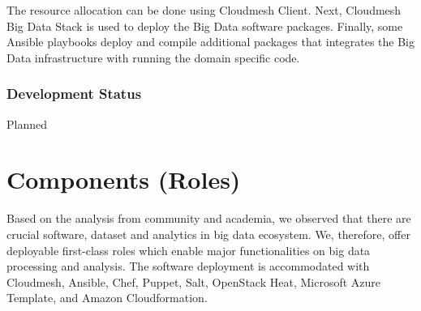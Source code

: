 \documentclass[9pt,twocolumn,twoside]{styles/osajnl}
\begin{document}
The resource allocation can be done using Cloudmesh Client.  Next,
Cloudmesh Big Data Stack is used to deploy the Big Data software
packages.  Finally, some Ansible playbooks deploy and compile
additional packages that integrates the Big Data infrastructure with
running the domain specific code.

\subsubsection{Development Status}

Planned




\section{Components (Roles)}

Based on the analysis from community and academia, we observed that
there are crucial software, dataset and analytics in big data
ecosystem. We, therefore, offer deployable first-class roles which
enable major functionalities on big data processing and analysis. The
software deployment is accommodated with Cloudmesh, Ansible, Chef,
Puppet, Salt, OpenStack Heat, Microsoft Azure Template, and Amazon
Cloudformation.
\end{document}
